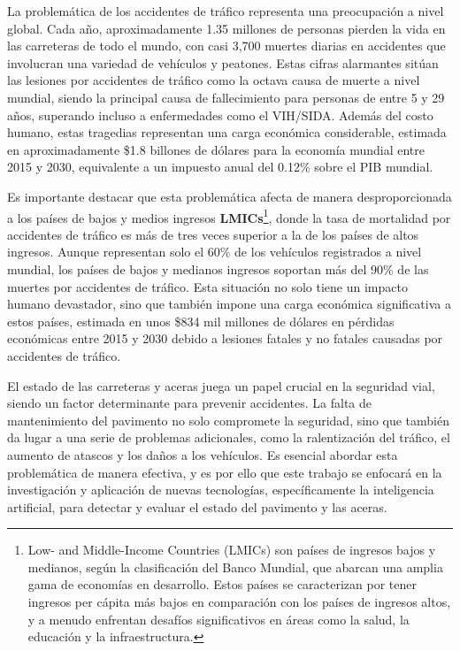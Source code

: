 
La problemática de los accidentes de tráfico representa una preocupación a nivel global. Cada año, aproximadamente 1.35 millones de personas pierden la vida en las carreteras de todo el mundo, con casi 3,700 muertes diarias en accidentes que involucran una variedad de vehículos y peatones\cite{WHO_Road_Safety}. Estas cifras alarmantes sitúan las lesiones por accidentes de tráfico como la octava causa de muerte a nivel mundial, siendo la principal causa de fallecimiento para personas de entre 5 y 29 años, superando incluso a enfermedades como el VIH/SIDA\cite{WHO_Road_Safety}. Además del costo humano, estas tragedias representan una carga económica considerable, estimada en aproximadamente \$1.8 billones de dólares para la economía mundial entre 2015 y 2030, equivalente a un impuesto anual del 0.12\% sobre el PIB mundial\cite{MACROECON_Road_Safety}.

Es importante destacar que esta problemática afecta de manera desproporcionada a los países de bajos y medios ingresos \textbf{LMICs}\footnote{Low- and Middle-Income Countries (LMICs) son países de ingresos bajos y medianos, según la clasificación del Banco Mundial, que abarcan una amplia gama de economías en desarrollo. Estos países se caracterizan por tener ingresos per cápita más bajos en comparación con los países de ingresos altos, y a menudo enfrentan desafíos significativos en áreas como la salud, la educación y la infraestructura.}, donde la tasa de mortalidad por accidentes de tráfico es más de tres veces superior a la de los países de altos ingresos\cite{WHO_Road_Safety}. Aunque representan solo el 60\% de los vehículos registrados a nivel mundial, los países de bajos y medianos ingresos soportan más del 90\% de las muertes por accidentes de tráfico. Esta situación no solo tiene un impacto humano devastador, sino que también impone una carga económica significativa a estos países, estimada en unos \$834 mil millones de dólares en pérdidas económicas entre 2015 y 2030 debido a lesiones fatales y no fatales causadas por accidentes de tráfico\cite{MACROECON_Road_Safety}.

El estado de las carreteras y aceras juega un papel crucial en la seguridad vial, siendo un factor determinante para prevenir accidentes. La falta de mantenimiento del pavimento no solo compromete la seguridad, sino que también da lugar a una serie de problemas adicionales, como la ralentización del tráfico, el aumento de atascos y los daños a los vehículos. Es esencial abordar esta problemática de manera efectiva, y es por ello que este trabajo se enfocará en la investigación y aplicación de nuevas tecnologías, específicamente la inteligencia artificial, para detectar y evaluar el estado del pavimento y las aceras.


